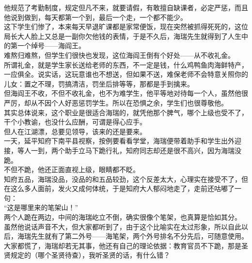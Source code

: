 \begin{multicols}{\theparacolNo}
他规范了考勤制度，规定但凡不来，就要请假，有敢擅自缺课者，必定严惩，而且他说到做到，每天都第一个到，最后一个走，一个都不能少。\\

这下学生们惨了，本来每天早退旷课都是家常便饭，现在突然被抓得死死的，这位局长大人脸上又总是一副你欠他钱的表情，于是不久后，海瑞先生就得到了人生中的第一个绰号——海阎王。\\

难熬归难熬，但学生们很快也发现，这位海阎王倒有个好处——从不收礼金。\\

所谓礼金，就是学生家长送给老师的东西，不一定是钱，什么鸡鸭鱼肉海鲜特产，一应俱全。说实话，这玩意谁也不想送，但如果不送，难保老师不会特意关照你的儿女：置之不理，罚搞清洁，罚坐后排等等，那都是手到擒来。\\

但海阎王不收，不但不收礼金，也不为难学生，他平等地对待每一个人，虽然他很严厉，却从不因个人好恶惩罚学生。所以在恐惧之余，学生们也很尊敬他。\\

其实总体说来，这个职业是很适合海瑞的，就凭他那个脾气，哪个上级也受不了，干个小教谕，也没什么应酬，可谓是得心应手。\\

但人在江湖漂，总要见领导，该来的还是要来。\\

一天，延平知府下南平县视察，按例要看看学堂，海瑞便带着助手和学生出外迎接，等人一到，两个助手立马下跪行礼，知府同志却还是很不高兴，因为海瑞没跪。\\

不但不跪，他还正面直视上级，眼睛都不眨。\\

知府五品，海瑞没品，没品的和五品较劲，这个反差太大，心理实在接受不了，但在这么多人面前，发火又成何体统，于是知府大人郁闷地走了，走前还咕嘟了一句：\\

“这是哪里来的笔架山！”\\

两个人跪在两边，中间的海瑞屹立不倒，确实很像个笔架，也真算是恰如其分。\\

虽然他说话声音不大，但大家都听到了，由于这个比喻实在太过形象，所以自此以后，海瑞先生就有了第二外号——海笔架，两个外号排名不分先后，可随意使用。\\

大家都慌了，海瑞却若无其事，他还有自己的理论依据：教育官员不下跪，那是圣贤规定的（哪个圣贤待查），我听圣贤的话，有什么错？\\


\end{multicols}
